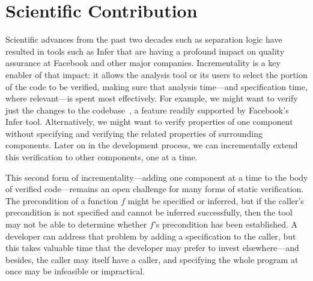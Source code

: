 \documentclass[10pt,twocolumn]{article}
\begin{document}
\begin{sloppypar}

\twocolumn[
\begin{center}
\Large
\textbf{Incremental Verification, Gradually}

\vspace{0.5cm}

\normalsize
\textbf{Jonathan Aldrich
(\href{https://dblp.uni-trier.de/pers/hd/a/Aldrich:Jonathan}{DBLP}
/\href{https://scholar.google.com/citations?user=AzHmOtcAAAAJ&hl=en}{GS}),
%
\'Eric Tanter (\href{https://dblp.uni-trier.de/pers/hd/t/Tanter:=Eacute=ric}{DBLP}/\href{https://scholar.google.com/citations?user=d0LISE4AAAAJ}{GS}), 
%
and Joshua Sunshine 
(\href{https://dblp.uni-trier.de/pers/hd/s/Sunshine:Joshua}{DBLP}
/\href{https://scholar.google.com/citations?user=V1texCUAAAAJ&hl=en&oi=ao}{GS})
}

\vspace{0.5cm}

\end{center}]

\section{Scientific Contribution}
\vspace{-2ex}

Scientific advances from the past two decades such as separation logic have resulted in tools such as Infer that are having a profound impact on quality assurance at Facebook and other major companies.  Incrementality is a key enabler of that impact: it allows the analysis tool or its users to select the portion of the code to be verified, making sure that analysis time---and specification time, where relevant---is spent most effectively.  For example, we might want to verify just the changes to the codebase~\cite{StartupsScaleups}, a feature readily supported by Facebook's Infer tool.  Alternatively, we might want to verify properties of one component without specifying and verifying the related properties of surrounding components.  Later on in the development process, we can incrementally extend this verification to other components, one at a time.

This second form of incrementality---adding one component at a time to the body of verified code---remains an open challenge for many forms of static verification. The precondition of a function $f$ might be specified or inferred, but if the caller's precondition is not specified and cannot be inferred successfully, then the tool may not be able to determine whether $f$'s precondition has been established. A developer can address that problem by adding a specification to the caller, but this takes valuable time that the developer may prefer to invest elsewhere---and besides, the caller may itself have a caller, and specifying the whole program at once may be infeasible or impractical.


\end{sloppypar}
\end{document}
